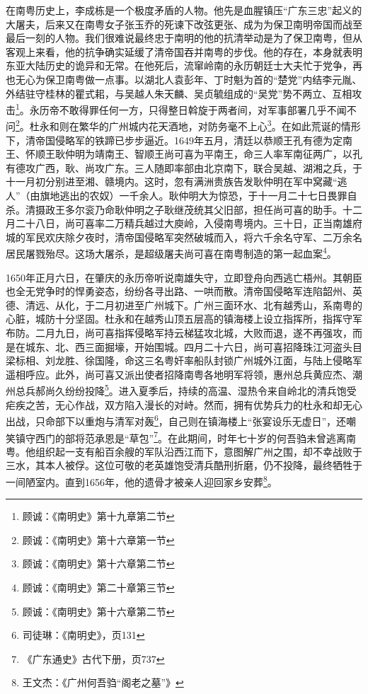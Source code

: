 在南粤历史上，李成栋是一个极度矛盾的人物。他先是血腥镇压“广东三忠”起义的大屠夫，后来又在南粤女子张玉乔的死谏下改弦更张、成为为保卫南明帝国而战至最后一刻的人物。我们很难说最终忠于南明的他的抗清举动是为了保卫南粤，但从客观上来看，他的抗争确实延缓了清帝国吞并南粤的步伐。他的存在，本身就表明东亚大陆历史的诡异和无常。在他死后，流窜岭南的永历朝廷士大夫忙于党争，再也无心为保卫南粤做一点事。以湖北人袁彭年、丁时魁为首的“楚党”内结李元胤、外结驻守桂林的瞿式耜，与吴越人朱天麟、吴贞毓组成的“吴党”势不两立、互相攻击\footnote{顾诚：《南明史》第十九章第二节}。永历帝不敢得罪任何一方，只得整日斡旋于两者间，对军事部署几乎不闻不问\footnote{顾诚：《南明史》第十六章第一节}。杜永和则在繁华的广州城内花天酒地，对防务毫不上心\footnote{顾诚：《南明史》第十六章第二节}。在如此荒诞的情形下，清帝国侵略军的铁蹄已步步逼近。1649年五月，清廷以恭顺王孔有德为定南王、怀顺王耿仲明为靖南王、智顺王尚可喜为平南王，命三人率军南征两广，以孔有德攻广西，耿、尚攻广东。三人随即率部由北京南下，联合吴越、湖湘之兵，于十一月初分别进至湘、赣境内。这时，忽有满洲贵族告发耿仲明在军中窝藏“逃人”（由旗地逃出的农奴）一千余人。耿仲明大为惊恐，于十一月二十七日畏罪自杀。清摄政王多尔衮乃命耿仲明之子耿继茂统其父旧部，担任尚可喜的助手。十二月二十八日，尚可喜率二万精兵越过大庾岭，入侵南粤境内。三十日，正当南雄府城的军民欢庆除夕夜时，清帝国侵略军突然破城而入，将六千余名守军、二万余名居民屠戮殆尽。这场大屠杀，是超级屠夫尚可喜在南粤制造的第一起血案\footnote{顾诚：《南明史》第二十章第三节}。

1650年正月六日，在肇庆的永历帝听说南雄失守，立即登舟向西逃亡梧州。其朝臣也全无党争时的悍勇姿态，纷纷各寻出路、一哄而散。清帝国侵略军连陷韶州、英德、清远、从化，于二月初进至广州城下。广州三面环水、北有越秀山，系南粤的心脏，城防十分坚固。杜永和在越秀山顶五层高的镇海楼上设立指挥所，指挥守军布防。二月九日，尚可喜指挥侵略军持云梯猛攻北城，大败而退，遂不再强攻，而是在城东、北、西三面掘壕，开始围城。四月二十六日，尚可喜招降珠江河盗头目梁标相、刘龙胜、徐国隆，命这三名粤奸率船队封锁广州城外江面，与陆上侵略军遥相呼应。此外，尚可喜又派出使者招降南粤各地明军将领，惠州总兵黄应杰、潮州总兵郝尚久纷纷投降\footnote{顾诚：《南明史》第十六章第二节}。进入夏季后，持续的高温、湿热令来自岭北的清兵饱受疟疾之苦，无心作战，双方陷入漫长的对峙。然而，拥有优势兵力的杜永和却无心出战，只命部下以重炮与清军对轰\footnote{司徒琳：《南明史》，页131}，自己则在镇海楼上“张宴设乐无虚日”，还嘲笑镇守西门的部将范承恩是“草包”\footnote{《广东通史》古代下册，页737}。在此期间，时年七十岁的何吾驺未曾逃离南粤。他组织起一支有船百余艘的军队沿西江而下，意图解广州之围，却不幸战败于三水，其本人被俘。这位可敬的老英雄饱受清兵酷刑折磨，仍不投降，最终牺牲于一间陋室内。直到1656年，他的遗骨才被亲人迎回家乡安葬\footnote{王文杰：《广州何吾驺“阁老之墓”》}。

